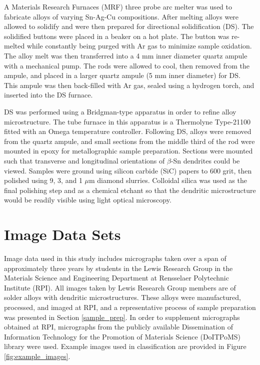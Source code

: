 A Materials Research Furnaces (MRF) three probe arc melter was used to fabricate alloys of varying Sn-Ag-Cu compositions.  After melting alloys were allowed to solidify and were then prepared for directional solidification (DS).  The solidified buttons were placed in a beaker on a hot plate.  The button was re-melted while constantly being purged with Ar gas to minimize sample oxidation. The alloy melt was then transferred into a 4 mm inner diameter quartz ampule with a mechanical pump.  The rods were allowed to cool, then removed from the ampule, and placed in a larger quartz ampule (5 mm inner diameter) for DS.  This ampule was then back-filled with Ar gas, sealed using a hydrogen torch, and inserted into the DS furnace.

DS was performed using a Bridgman-type apparatus in order to refine alloy microstructure.  The tube furnace in this apparatus is a Thermolyne Type-21100 fitted with an Omega temperature controller.
Following DS, alloys were removed from the quartz ampule, and small sections from the middle third of the rod were mounted in epoxy for metallographic sample preparation.  Sections were mounted such that transverse and longitudinal orientations of $\beta$-Sn dendrites could be viewed.  Samples were ground using silicon carbide (SiC) papers to 600 grit, then polished using 9, 3, and 1 $\mu$m diamond slurries.  Colloidal silica was used as the final polishing step and as a chemical etchant so that the dendritic microstructure would be readily visible using light optical microscopy.

\section{Image Data Sets}
\label{data_sets}

Image data used in this study includes micrographs taken over a span of approximately three years by students in the Lewis Research Group in the Materials Science and Engineering Department at Rensselaer Polytechnic Institute (RPI).  All images taken by Lewis Research Group members are of solder alloys with dendritic microstructures.  These alloys were manufactured, processed, and imaged at RPI, and a representative process of sample preparation was presented in Section \ref{sample_prep}.  In order to supplement micrographs obtained at RPI, micrographs from the publicly available Dissemination of Information Technology for the Promotion of Materials Science (DoITPoMS) library \cite{Barber2003} were used. Example images used in classification are provided in Figure \ref{fig:example_images}.   

